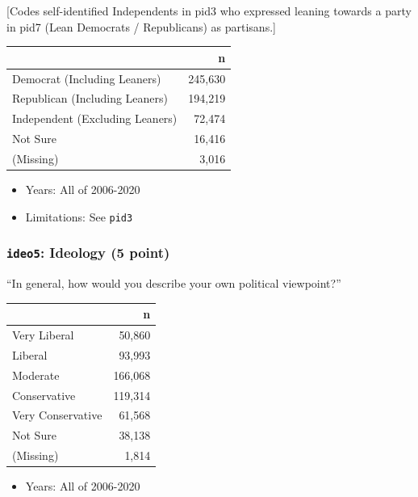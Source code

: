 \documentclass[10pt,article,oneside]{memoir}
\theoremstyle{definition}
\begin{document}
{[}Codes self-identified Independents in pid3 who expressed leaning
towards a party in pid7 (Lean Democrats / Republicans) as partisans.{]}

\begin{table}[H]
\centering
\begin{tabular}[t]{lr}
\toprule
 & n\\
\midrule
Democrat (Including Leaners) & 245,630\\
Republican (Including Leaners) & 194,219\\
Independent (Excluding Leaners) & 72,474\\
Not Sure & 16,416\\
(Missing) & 3,016\\
\bottomrule
\end{tabular}
\end{table}

\begin{itemize}
\tightlist
\item
  Years: All of 2006-2020
\item
  Limitations: See \texttt{pid3}
\end{itemize}

\hypertarget{ideo5-ideology-5-point}{%
\subsubsection{\texorpdfstring{\texttt{ideo5}: Ideology (5
point)}{ideo5: Ideology (5 point)}}\label{ideo5-ideology-5-point}}

``In general, how would you describe your own political viewpoint?''

\begin{table}[H]
\centering
\begin{tabular}[t]{lr}
\toprule
 & n\\
\midrule
Very Liberal & 50,860\\
Liberal & 93,993\\
Moderate & 166,068\\
Conservative & 119,314\\
Very Conservative & 61,568\\
Not Sure & 38,138\\
(Missing) & 1,814\\
\bottomrule
\end{tabular}
\end{table}

\begin{itemize}
\tightlist
\item
  Years: All of 2006-2020
\end{itemize}
\end{document}
